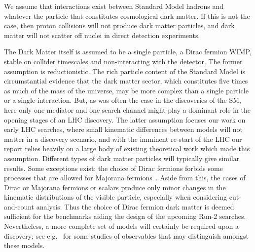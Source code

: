We assume that interactions exist between Standard Model hadrons
and whatever the particle that constitutes cosmological dark matter. If this
is not the case, then proton collisions will not produce dark matter
particles, and dark matter will not scatter off nuclei in direct
detection experiments.

The Dark Matter itself is assumed to be a single particle, a Dirac
fermion WIMP, stable on collider timescales and non-interacting with
the detector.  
The former assumption is reductionistic.
The rich particle content of the Standard Model is circumstantial evidence that
the dark matter sector, which constitutes five times as much of the
mass of the universe, may be more complex than a single particle or a
single interaction. But, as was often the case in the discoveries of
the SM, here only one mediator and one search channel might play a
dominant role in the opening stages of an LHC discovery. The latter
assumption focuses our work on early LHC searches, where small
kinematic differences between models will not matter in a discovery
scenario, and with the imminent re-start of the LHC our report relies
heavily on a large body of existing theoretical work which made this
assumption. Different types of dark matter particles will typically
give similar results.
Some exceptions exist:  the choice of Dirac fermions forbids some
processes that are allowed for Majorana fermions~\cite{Goodman:2010yf}.
Aside from this, the cases
of Dirac or Majorana fermions or scalars produce only minor changes
in the kinematic distributions of the visible particle, especially
when considering cut-and-count analysis. Thus the choice of Dirac
fermion dark matter is deemed sufficient for the benchmarks aiding the
design of the upcoming Run-2 searches. Nevertheless, a more complete
set of models will certainly be required upon a discovery; see
e.g.~\cite{Cotta:2012nj,Haisch:2013fla,Crivellin:2015wva} for some
studies of observables that may distinguish amongst these models.

